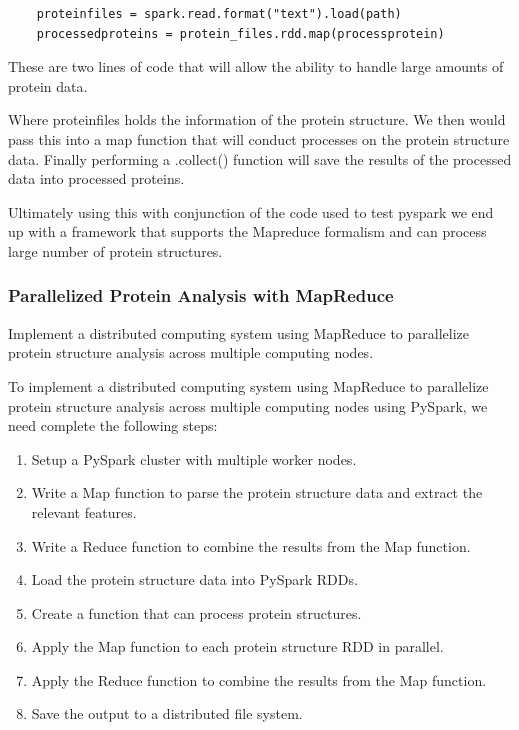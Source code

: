 \documentclass[]{final_report}
\begin{document}
\begin{lstlisting}
    proteinfiles = spark.read.format("text").load(path)
    processedproteins = protein_files.rdd.map(processprotein)
\end{lstlisting}

These are two lines of code that will allow the ability to handle large amounts of protein data. 

Where proteinfiles holds the information of the protein structure. We then would pass this into a map function that will conduct processes on the protein structure data. Finally performing a .collect() function will save the results of the processed data into processed proteins.

Ultimately using this with conjunction of the code used to test pyspark we end up with a framework that supports the Mapreduce formalism and can process large number of protein structures.

\clearpage

\subsubsection{Parallelized Protein Analysis with MapReduce}

\begin{displayquote}
    Implement a distributed computing system using MapReduce to parallelize protein structure analysis across multiple computing nodes.
\end{displayquote}

To implement a distributed computing system using MapReduce to parallelize protein structure analysis across multiple computing nodes using PySpark, we need complete the following steps:

\begin{enumerate}
    \item Setup a PySpark cluster with multiple worker nodes.
    \item Write a Map function to parse the protein structure data and extract the relevant features.
    \item Write a Reduce function to combine the results from the Map function.
    \item Load the protein structure data into PySpark RDDs.
    \item Create a function that can process protein structures.
    \item Apply the Map function to each protein structure RDD in parallel.
    \item Apply the Reduce function to combine the results from the Map function.
    \item Save the output to a distributed file system.
\end{enumerate}
\end{document}
